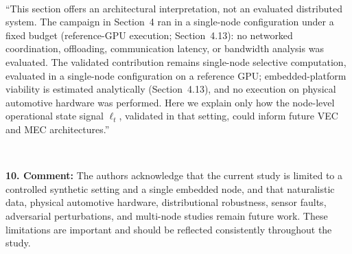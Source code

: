 \documentclass[1p,12pt,authoryear]{elsarticle}
\begin{document}
~

``This section offers an architectural interpretation, not an evaluated distributed system. The campaign in Section~4 ran in a single-node configuration under a fixed budget (reference-GPU execution; Section~4.13): no networked coordination, offloading, communication latency, or bandwidth analysis was evaluated. The validated contribution remains single-node selective computation, evaluated in a single-node configuration on a reference GPU; embedded-platform viability is estimated analytically (Section~4.13), and no execution on physical automotive hardware was performed. Here we explain only how the node-level operational state signal $\ell_t$, validated in that setting, could inform future VEC and MEC architectures.''

~

\noindent \textbf{10. Comment:} The authors acknowledge that the current study is limited to a controlled synthetic setting and a single embedded node, and that naturalistic data, physical automotive hardware, distributional robustness, sensor faults, adversarial perturbations, and multi-node studies remain future work. These limitations are important and should be reflected consistently throughout the study.
\end{document}
